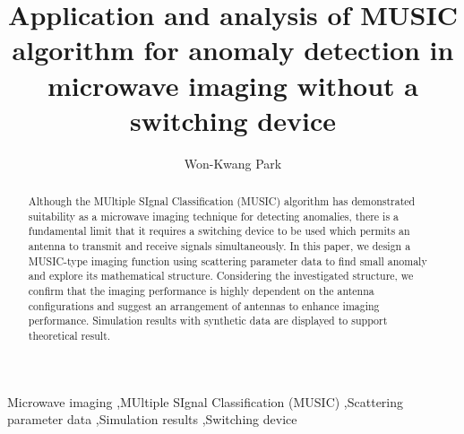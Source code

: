 \documentclass[3p,10pt]{elsarticle}
\theoremstyle{plain}
\theoremstyle{remark}
\begin{document}
\begin{frontmatter}



\title{Application and analysis of MUSIC algorithm for anomaly detection in microwave imaging without a switching device}

\author{Won-Kwang Park}
\address{Department of Information Security, Cryptology, and Mathematics, Kookmin University, Seoul, 02707, Korea.}

\begin{abstract}
Although the MUltiple SIgnal Classification (MUSIC) algorithm has demonstrated suitability as a microwave imaging technique for detecting anomalies, there is a fundamental limit that it requires a switching device to be used which permits an antenna to transmit and receive signals simultaneously. In this paper, we design a MUSIC-type imaging function using scattering parameter data to find small anomaly and explore its mathematical structure. Considering the investigated structure, we confirm that the imaging performance is highly dependent on the antenna configurations and suggest an arrangement of antennas to enhance imaging performance. Simulation results with synthetic data are displayed to support theoretical result.
\end{abstract}

\begin{keyword}
Microwave imaging \sep MUltiple SIgnal Classification (MUSIC) \sep Scattering parameter data \sep Simulation results \sep Switching device


\end{keyword}

\end{frontmatter}
\end{document}
